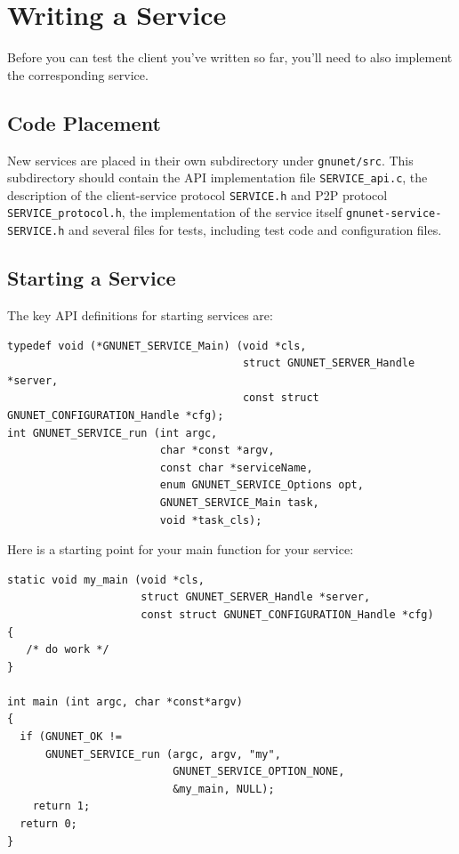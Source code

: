 \documentclass[10pt]{article}
\begin{document}
\section{Writing a Service}

Before you can test the client you've written so far, you'll need to also
implement the corresponding service.


\subsection{Code Placement}

New services are placed in their own subdirectory under {\tt gnunet/src}.
This subdirectory should contain the API implementation file {\tt SERVICE\_api.c},
the description of the client-service protocol {\tt SERVICE.h} and P2P protocol
{\tt SERVICE\_protocol.h}, the implementation of the service itself
{\tt gnunet-service-SERVICE.h} and several files for tests, including test code
and configuration files.

\subsection{Starting a Service}

The key API definitions for starting services are:
\lstset{language=C}
\begin{lstlisting}
typedef void (*GNUNET_SERVICE_Main) (void *cls,
                                     struct GNUNET_SERVER_Handle *server,
                                     const struct GNUNET_CONFIGURATION_Handle *cfg);
int GNUNET_SERVICE_run (int argc,
                        char *const *argv,
                        const char *serviceName,
                       	enum GNUNET_SERVICE_Options opt,
                        GNUNET_SERVICE_Main task,
                        void *task_cls);
\end{lstlisting}

Here is a starting point for your main function for your service:

\lstset{language=c}
\begin{lstlisting}
static void my_main (void *cls,
                     struct GNUNET_SERVER_Handle *server,
                     const struct GNUNET_CONFIGURATION_Handle *cfg)
{
   /* do work */
}

int main (int argc, char *const*argv)
{
  if (GNUNET_OK !=
      GNUNET_SERVICE_run (argc, argv, "my",
                          GNUNET_SERVICE_OPTION_NONE,
                          &my_main, NULL);
    return 1;
  return 0;
}
\end{lstlisting}
\end{document}

